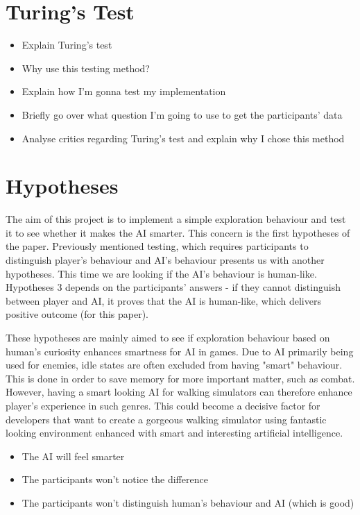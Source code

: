 \documentclass[journal]{IEEEtran}
\begin{document}
\section{Turing's Test}
\begin{itemize}
	\item Explain Turing's test
	\item Why use this testing method?
	\item Explain how I'm gonna test my implementation
	\item Briefly go over what question I'm going to use to get the participants' data
	\item Analyse critics regarding Turing's test and explain why I chose this method
\end{itemize}

\section{Hypotheses}
The aim of this project is to implement a simple exploration behaviour and test it to see whether it makes the AI smarter. This concern is the first hypotheses of the paper. Previously mentioned testing, which requires participants to distinguish player's behaviour and AI's behaviour presents us with another hypotheses. This time we are looking if the AI's behaviour is human-like. Hypotheses 3 depends on the participants' answers - if they cannot distinguish between player and AI, it proves that the AI is human-like, which delivers positive outcome (for this paper).

These hypotheses are mainly aimed to see if exploration behaviour based on human's curiosity enhances smartness for AI in games. Due to AI primarily being used for enemies, idle states are often excluded from having "smart" behaviour. This is done in order to save memory for more important matter, such as combat. However, having a smart looking AI for walking simulators can therefore enhance player's experience in such genres. This could become a decisive factor for developers that want to create a gorgeous walking simulator using fantastic looking environment enhanced with smart and interesting artificial intelligence.
\begin{itemize}
	\item The AI will feel smarter
	\item The participants won't notice the difference
	\item The participants won't distinguish human's behaviour and AI (which is good)
\end{itemize}
\end{document}
